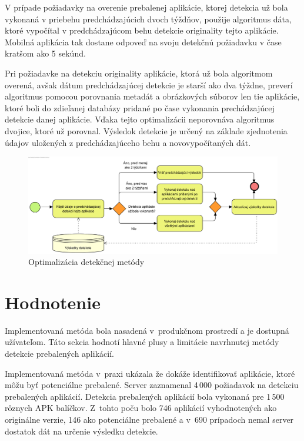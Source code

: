 V prípade požiadavky na overenie prebalenej aplikácie, ktorej detekcia už bola vykonaná v priebehu predchádzajúcich dvoch týždňov, použije algoritmus dáta, ktoré vypočítal v predchádzajúcom behu detekcie originality tejto aplikácie. Mobilná aplikácia tak dostane odpoveď na svoju detekčnú požiadavku v čase kratšom ako 5 sekúnd.

Pri požiadavke na detekciu originality aplikácie, ktorá už bola algoritmom overená, avšak dátum predchádzajúcej detekcie je starší ako dva týždne, preverí algoritmus pomocou porovnania metadát a obrázkových súborov len tie aplikácie, ktoré boli do zdieľanej databázy pridané po čase vykonania prechádzajúcej detekcie danej aplikácie. Vďaka tejto optimalizácii neporovnáva algoritmus dvojice, ktoré už porovnal. Výsledok detekcie je určený na základe zjednotenia údajov  uložených z predchádzajúceho behu a novovypočítaných dát. 

\begin{figure}[H]
  \begin{center}
    \includegraphics[width=130mm]{images/detection-optimalization.png}
  \end{center}
  \caption{Optimalizácia detekčnej metódy}
  \label{fig:detectionOriginal}
\end{figure}

\section{Hodnotenie}
\label{sec:hodnotenie}
Implementovaná metóda bola nasadená v~produkčnom prostredí a je dostupná užívateľom. Táto sekcia hodnotí hlavné plusy a limitácie navrhnutej metódy detekcie prebalených aplikácií.

Implementovaná metóda v~praxi ukázala že dokáže identifikovať aplikácie, ktoré môžu byť potenciálne prebalené. Server zaznamenal 4\,000 požiadavok na detekciu prebalených aplikácií. Detekcia prebalených aplikácií bola vykonaná pre 1\,500 rôznych APK balíčkov.  Z~tohto poču bolo 746 aplikácií vyhodnotených ako originálne verzie, 146 ako potenciálne prebalené a v~690 prípadoch nemal server dostatok dát na určenie výsledku detekcie.

